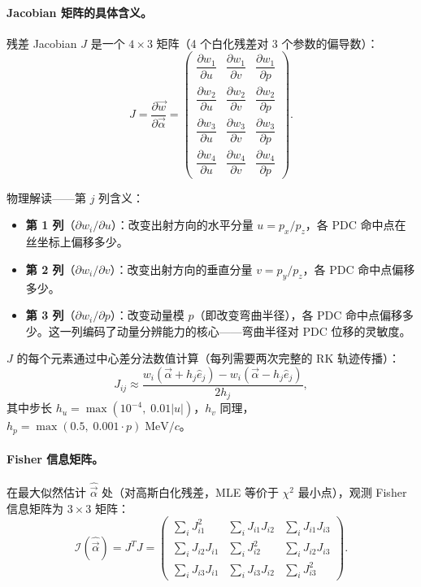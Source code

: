 \documentclass[a4paper, 11pt]{article}
\begin{document}
\paragraph{Jacobian 矩阵的具体含义。}
残差 Jacobian $J$ 是一个 $4 \times 3$ 矩阵（4 个白化残差对 3 个参数的偏导数）：
\begin{equation}
  J = \frac{\partial \vec{w}}{\partial \vec{\alpha}} =
  \begin{pmatrix}
    \dfrac{\partial w_1}{\partial u} & \dfrac{\partial w_1}{\partial v} & \dfrac{\partial w_1}{\partial p} \\[8pt]
    \dfrac{\partial w_2}{\partial u} & \dfrac{\partial w_2}{\partial v} & \dfrac{\partial w_2}{\partial p} \\[8pt]
    \dfrac{\partial w_3}{\partial u} & \dfrac{\partial w_3}{\partial v} & \dfrac{\partial w_3}{\partial p} \\[8pt]
    \dfrac{\partial w_4}{\partial u} & \dfrac{\partial w_4}{\partial v} & \dfrac{\partial w_4}{\partial p}
  \end{pmatrix}.
  \label{eq:jacobian_explicit}
\end{equation}

物理解读——第 $j$ 列含义：
\begin{itemize}[nosep]
  \item \textbf{第 1 列}（$\partial w_i / \partial u$）：改变出射方向的水平分量 $u = p_x/p_z$，各 PDC 命中点在丝坐标上偏移多少。
  \item \textbf{第 2 列}（$\partial w_i / \partial v$）：改变出射方向的垂直分量 $v = p_y/p_z$，各 PDC 命中点偏移多少。
  \item \textbf{第 3 列}（$\partial w_i / \partial p$）：改变动量模 $p$（即改变弯曲半径），各 PDC 命中点偏移多少。这一列编码了动量分辨能力的核心——弯曲半径对 PDC 位移的灵敏度。
\end{itemize}

$J$ 的每个元素通过中心差分法数值计算（每列需要两次完整的 RK 轨迹传播）：
\begin{equation}
  J_{ij} \approx \frac{w_i(\vec{\alpha} + h_j \hat{e}_j) - w_i(\vec{\alpha} - h_j \hat{e}_j)}{2 h_j},
\end{equation}
其中步长 $h_u = \max(10^{-4},\; 0.01 |u|)$，$h_v$ 同理，$h_p = \max(0.5,\; 0.001 \cdot p)\;\mathrm{MeV}/c$。

\paragraph{Fisher 信息矩阵。}
在最大似然估计 $\hat{\vec{\alpha}}$ 处（对高斯白化残差，MLE 等价于 $\chi^2$ 最小点），观测 Fisher 信息矩阵为 $3 \times 3$ 矩阵：
\begin{equation}
  \mathcal{I}(\hat{\vec{\alpha}}) = J^T J =
  \begin{pmatrix}
    \sum_i J_{i1}^2 & \sum_i J_{i1} J_{i2} & \sum_i J_{i1} J_{i3} \\
    \sum_i J_{i2} J_{i1} & \sum_i J_{i2}^2 & \sum_i J_{i2} J_{i3} \\
    \sum_i J_{i3} J_{i1} & \sum_i J_{i3} J_{i2} & \sum_i J_{i3}^2
  \end{pmatrix}.
\end{equation}
\end{document}
